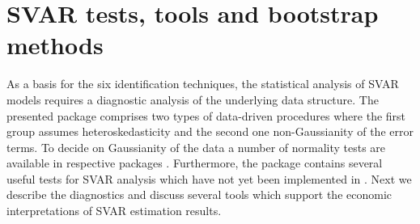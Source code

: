 \documentclass[nojss]{jss}\usepackage[]{graphicx}\usepackage[]{color}
\begin{document}
\section{SVAR tests, tools and bootstrap methods}\label{sec:tools}

As a basis for the six identification techniques, the statistical analysis of SVAR models requires a diagnostic analysis of the underlying data structure. The presented package comprises two types of data-driven procedures where the first group assumes heteroskedasticity and the second one non-Gaussianity of the error terms. To decide on Gaussianity of the data a number of normality tests are available in respective  packages \citep[see e.g.,  and ,][]{normtest, ICtest}. Furthermore, the  package contains several useful tests for SVAR analysis which have not yet been implemented in . Next we describe the diagnostics and discuss several tools which support the economic interpretations of SVAR estimation results.
\end{document}
